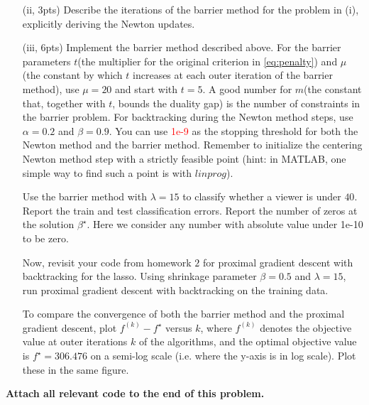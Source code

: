 \documentclass{article}
\theoremstyle{remark}
\theoremstyle{definition}
\begin{document}
\begin{enumerate}[(a)]
\begin{enumerate}
	    \item[(ii, 3pts)] Describe the iterations of the barrier method for the problem in (i), explicitly deriving the Newton updates.
	    \item[(iii, 6pts)] Implement the barrier method described above. For the barrier parameters $t$(the multiplier for the original criterion in \eqref{eq:penalty}) and $\mu$(the constant by which $t$ increases at each outer iteration of the barrier method), use $\mu=20$ and start with $t=5$. A good number for $m$(the constant that, together with $t$, bounds the duality gap) is the number of constraints in the barrier problem. For backtracking during the Newton method steps, use $\alpha=0.2$ and $\beta=0.9$. You can use \textcolor{red}{1e-9} as the stopping threshold for both the Newton method and the barrier method. Remember to initialize the centering Newton method step with a strictly feasible point (hint: in MATLAB, one simple way to find such a point is with $linprog$).
    
	    Use the barrier method with $\lambda=15$ to classify whether a viewer is under $40$. Report the train and test classification errors. Report the number of zeros at the solution $\beta^{\star}$. Here we consider any number with absolute value under 1e-10 to be zero.
	    
	    Now, revisit your code from homework $2$ for proximal gradient descent with backtracking for the lasso. Using shrinkage parameter $\beta=0.5$ and $\lambda=15$, run proximal gradient descent with backtracking on the training data.
	    
	    To compare the convergence of both the barrier method and the proximal gradient descent, plot $f^{(k)} - f^{\star}$ versus $k$,  where $f^{(k)}$ denotes the objective value at outer iterations $k$ of the algorithms, and the optimal objective value is $f^\star = 306.476$ on a semi-log scale (i.e. where the y-axis is in log scale). Plot these in the same figure.
	    \end{enumerate}
\end{enumerate}

\textbf{Attach all relevant code to the end of this problem.}
\end{document}
